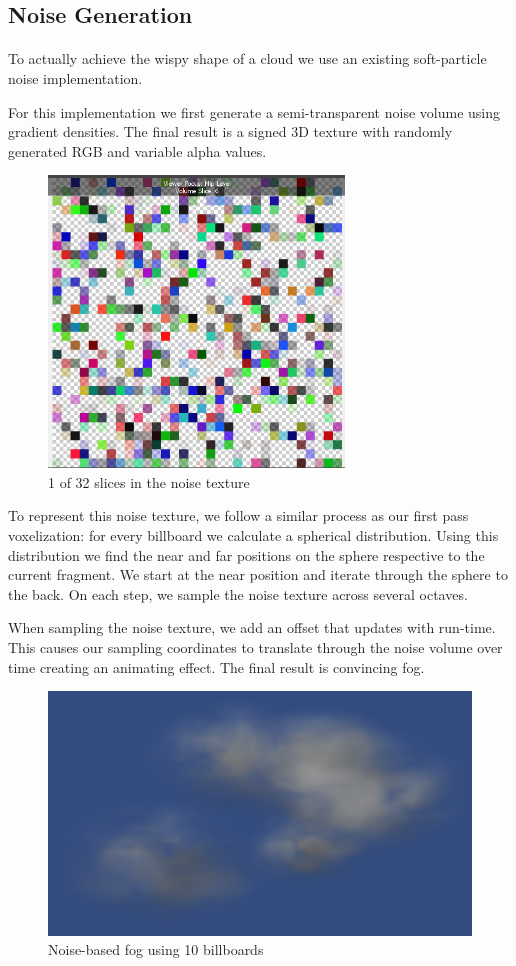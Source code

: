 \subsection{Noise Generation}\paragraph{}
To actually achieve the wispy shape of a cloud we use an existing soft-particle noise implementation. 

For this implementation we first generate a semi-transparent noise volume using gradient densities. The final result is a signed 3D texture with randomly generated RGB and variable alpha values.

\begin{figure}[h]
\centering
\includegraphics[width=0.7\textwidth]{../res/noiseslice.png}
\caption{1 of 32 slices in the noise texture}
\end{figure}

To represent this noise texture, we follow a similar process as our first pass voxelization: for every billboard we calculate a spherical distribution. Using this distribution we find the near and far positions on the sphere respective to the current fragment. We start at the near position and iterate through the sphere to the back. On each step, we sample the noise texture across several octaves. 

When sampling the noise texture, we add an offset that updates with run-time. This causes our sampling coordinates to translate through the noise volume over time creating an animating effect. The final result is convincing fog.

\begin{figure}[h]
\centering
\includegraphics[width=\textwidth]{../res/fog.png}
\caption{Noise-based fog using 10 billboards}
\end{figure}


